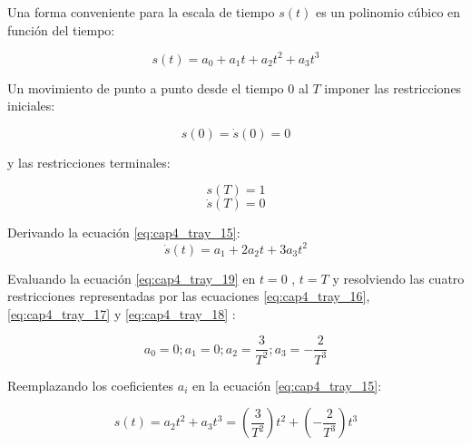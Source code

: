             Una forma conveniente para la escala de tiempo $s(t)$ es un polinomio cúbico en función del tiempo: 
            
            \begin{equation}
                s(t)= a_{0}+a_{1}t+a_{2}t^{2}+a_{3}t^{3}
                \label{eq:cap4_tray_15}
             \end{equation}     
        
            Un movimiento de punto a punto desde el tiempo $0$ al  $T$ imponer las restricciones iniciales:
        
            \begin{equation}
                s(0)= \dot{s}(0) = 0 
                \label{eq:cap4_tray_16}
             \end{equation} 
             
             y las restricciones terminales:
             
            \begin{equation}
                s(T) = 1 
                \label{eq:cap4_tray_17}
             \end{equation} 
            \begin{equation}
                \dot{s}(T) = 0 
                \label{eq:cap4_tray_18}
             \end{equation}         
             
            Derivando la ecuación \ref{eq:cap4_tray_15}:
            \begin{equation}
                \dot{s}(t)= a_{1}+2a_{2}t+3a_{3}t^{2}
                \label{eq:cap4_tray_19}
             \end{equation}     
            
        Evaluando la ecuación \ref{eq:cap4_tray_19} en  $t = 0$ , $t = T$ y resolviendo las cuatro restricciones representadas por las ecuaciones  \ref{eq:cap4_tray_16},\ref{eq:cap4_tray_17} y \ref{eq:cap4_tray_18} :
        
            \begin{equation}
                 a_{0}=0;a_{1}=0;a_{2}=\frac{3}{T^2};a_{3}=-\frac{2}{T^3}
                \label{eq:cap4_tray_20}
             \end{equation}     
        
        Reemplazando los coeficientes $a_i$ en la ecuación \ref{eq:cap4_tray_15}: 
        
            \begin{equation}
                s(t)=a_{2}t^{2}+a_{3}t^{3} = (\frac{3}{T^2})t^{2}+(-\frac{2}{T^3})t^{3}
                \label{eq:cap4_tray_21}
             \end{equation}  
             

